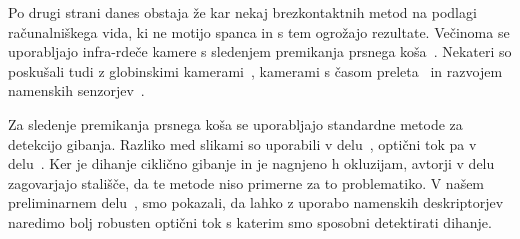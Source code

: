 Po drugi strani danes obstaja že kar nekaj brezkontaktnih metod na podlagi računalniškega vida, ki ne motijo spanca in s tem ogrožajo rezultate. Večinoma se uporabljajo infra-rdeče kamere s sledenjem premikanja prsnega koša~\cite{sathyanarayana2015vision}. Nekateri so poskušali tudi z globinskimi kamerami~\cite{yang2014sleep}, kamerami s časom preleta~\cite{falie2009statistical} in razvojem namenskih senzorjev~\cite{takemura2005respiratory}.

Za sledenje premikanja prsnega koša se uporabljajo standardne metode za detekcijo gibanja. Razliko med slikami so uporabili v delu~\cite{nakai2000non}, optični tok pa v delu~\cite{nakajima2001development}. Ker je dihanje ciklično gibanje in je nagnjeno h okluzijam, avtorji v delu~\cite{wang2014unconstrained} zagovarjajo stališče, da te metode niso primerne za to problematiko. V našem preliminarnem delu~\cite{koporec2017observation}, smo pokazali, da lahko z uporabo namenskih deskriptorjev naredimo bolj robusten optični tok s katerim smo sposobni detektirati dihanje.
